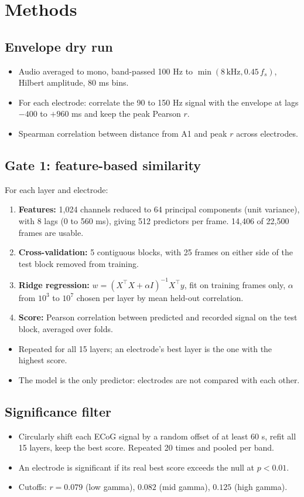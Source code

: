 \documentclass[11pt]{article}
\begin{document}
\section{Methods}
\subsection{Envelope dry run}
\begin{itemize}
  \item Audio averaged to mono, band-passed 100 Hz to $\min(8\,\mathrm{kHz}, 0.45\,f_s)$, Hilbert amplitude, 80 ms bins.
  \item For each electrode: correlate the 90 to 150 Hz signal with the envelope at lags $-400$ to $+960$ ms and keep the peak Pearson $r$.
  \item Spearman correlation between distance from A1 and peak $r$ across electrodes.
\end{itemize}

\subsection{Gate 1: feature-based similarity}
For each layer and electrode:
\begin{enumerate}
  \item \textbf{Features:} 1,024 channels reduced to 64 principal components (unit variance), with 8 lags (0 to 560 ms), giving 512 predictors per frame. 14,406 of 22,500 frames are usable.
  \item \textbf{Cross-validation:} 5 contiguous blocks, with 25 frames on either side of the test block removed from training.
  \item \textbf{Ridge regression:} $w = (X^\top X + \alpha I)^{-1} X^\top y$, fit on training frames only, $\alpha$ from $10^3$ to $10^7$ chosen per layer by mean held-out correlation.
  \item \textbf{Score:} Pearson correlation between predicted and recorded signal on the test block, averaged over folds.
\end{enumerate}
\begin{itemize}
  \item Repeated for all 15 layers; an electrode's best layer is the one with the highest score.
  \item The model is the only predictor: electrodes are not compared with each other.
\end{itemize}

\subsection{Significance filter}
\begin{itemize}
  \item Circularly shift each ECoG signal by a random offset of at least 60 s, refit all 15 layers, keep the best score. Repeated 20 times and pooled per band.
  \item An electrode is significant if its real best score exceeds the null at $p < 0.01$.
  \item Cutoffs: $r = 0.079$ (low gamma), $0.082$ (mid gamma), $0.125$ (high gamma).
\end{itemize}
\end{document}
